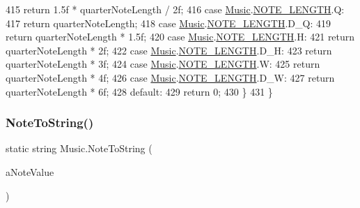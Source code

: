 \begin{DoxyCode}
415                 \textcolor{keywordflow}{return} 1.5f * quarterNoteLength / 2f;
416             \textcolor{keywordflow}{case} \hyperlink{class_music}{Music}.\hyperlink{group___music_enums_gaf11b5f079adbb21c800b9eca1c5c3cbd}{NOTE\_LENGTH}.Q:
417                 \textcolor{keywordflow}{return} quarterNoteLength;
418             \textcolor{keywordflow}{case} \hyperlink{class_music}{Music}.\hyperlink{group___music_enums_gaf11b5f079adbb21c800b9eca1c5c3cbd}{NOTE\_LENGTH}.D\_Q:
419                 \textcolor{keywordflow}{return} quarterNoteLength * 1.5f;
420             \textcolor{keywordflow}{case} \hyperlink{class_music}{Music}.\hyperlink{group___music_enums_gaf11b5f079adbb21c800b9eca1c5c3cbd}{NOTE\_LENGTH}.H:
421                 \textcolor{keywordflow}{return} quarterNoteLength * 2f;
422             \textcolor{keywordflow}{case} \hyperlink{class_music}{Music}.\hyperlink{group___music_enums_gaf11b5f079adbb21c800b9eca1c5c3cbd}{NOTE\_LENGTH}.D\_H:
423                 \textcolor{keywordflow}{return} quarterNoteLength * 3f;
424             \textcolor{keywordflow}{case} \hyperlink{class_music}{Music}.\hyperlink{group___music_enums_gaf11b5f079adbb21c800b9eca1c5c3cbd}{NOTE\_LENGTH}.W:
425                 \textcolor{keywordflow}{return} quarterNoteLength * 4f;
426             \textcolor{keywordflow}{case} \hyperlink{class_music}{Music}.\hyperlink{group___music_enums_gaf11b5f079adbb21c800b9eca1c5c3cbd}{NOTE\_LENGTH}.D\_W:
427                 \textcolor{keywordflow}{return} quarterNoteLength * 6f;
428             \textcolor{keywordflow}{default}:
429                 \textcolor{keywordflow}{return} 0;
430         \}
431     \}
\end{DoxyCode}
\mbox{\label{group___music_static_func_ga85a22c905d56d4c5f4e62159bfecee8c}} 
\subsubsection{\texorpdfstring{Note\+To\+String()}{NoteToString()}\hspace{0.1cm}{\footnotesize\ttfamily [1/2]}}
{\footnotesize\ttfamily static string Music.\+Note\+To\+String (\begin{DoxyParamCaption}\item[{\hyperlink{group___music_enums_ga508f69b199ea518f935486c990edac1d}{P\+I\+T\+CH}}]{a\+Note\+Value }\end{DoxyParamCaption})\hspace{0.3cm}{\ttfamily [static]}}



